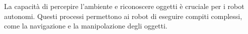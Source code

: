 La capacità di percepire l'ambiente e riconoscere oggetti è cruciale per i robot autonomi. Questi processi permettono ai robot di eseguire compiti complessi, come la navigazione e la manipolazione degli oggetti.